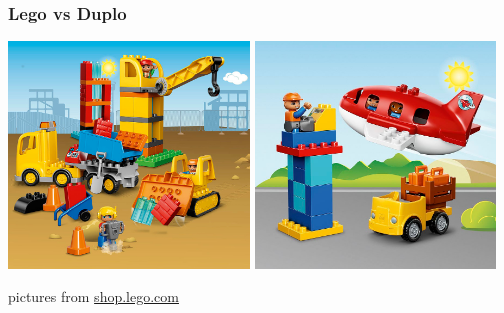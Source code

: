 \documentclass{beamer}
\begin{document}
\begin{frame}
  \frametitle{Lego vs Duplo}
  \begin{center}
    \includegraphics[width=0.48\textwidth]{../images/duplo-construction.jpg}
    \hspace{1mm}
    \includegraphics[width=0.48\textwidth]{../images/duplo-airport.jpg}
  \end{center}
  \vfill
  \begin{center}
    {\tiny pictures from \url{shop.lego.com}}
  \end{center}
\end{frame}
\end{document}
